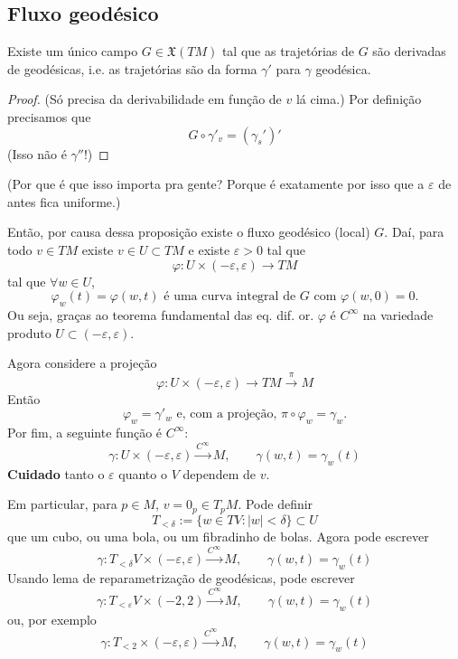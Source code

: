 \subsection{Fluxo geodésico}

\begin{prop}\leavevmode
Existe um único campo \(G \in \mathfrak{X}(TM)\) tal que as trajetórias de \(G\) são derivadas de geodésicas, i.e. as trajetórias são da forma \(\gamma'\) para \(\gamma\) geodésica.
\end{prop}

\begin{proof}\leavevmode
(Só precisa da derivabilidade em função de \(v\) lá cima.) Por definição precisamos que 
\[G \circ \gamma'_v=(\gamma_s')'\]
(Isso não é \(\gamma''\)!)
\end{proof}

(Por que é que isso importa pra gente? Porque é exatamente por isso que a \(\varepsilon\) de antes fica uniforme.)

Então, por causa dessa proposição existe o fluxo geodésico (local) \(G\). Daí, para todo \(v \in TM\) existe \(v \in U \subset TM\) e existe \(\varepsilon>0\) tal que
\[\varphi: U \times (-\varepsilon,\varepsilon) \longrightarrow TM\]
tal que \(\forall  w \in U\),
\[\varphi_w(t)=\varphi(w,t)\text{ é uma curva integral de \(G\) com \(\varphi(w,0)=0\).} \]
Ou seja, graças ao teorema fundamental das eq. dif. or. \(\varphi\) é \(C^\infty\) na variedade produto \(U \subset (-\varepsilon,\varepsilon)\).

Agora considere a projeção
\[\varphi: U \times (-\varepsilon,\varepsilon) \longrightarrow TM\xrightarrow{\pi} M\]
Então
\[\varphi_w=\gamma'_w \text{ e, com a projeção, } \pi\circ \varphi_w=\gamma_w.\]
Por fim, a seguinte função é \(C^\infty\):
\[\gamma:U \times (-\varepsilon,\varepsilon) \xrightarrow{C^\infty}M,\qquad  \gamma(w,t)=\gamma_w(t)\]
\textbf{Cuidado} tanto o \(\varepsilon\) quanto o \(V\) dependem de \(v\).

Em particular, para \(p \in M\), \(v =0_p \in T_pM\). Pode definir
\[T_{< \delta}:=\{w \in TV: |w|< \delta\} \subset U\]
que um cubo, ou uma bola, ou um fibradinho de bolas. Agora pode escrever
\[\gamma:T_{< \delta}V \times (-\varepsilon,\varepsilon) \xrightarrow{C^\infty}M,\qquad  \gamma(w,t)=\gamma_w(t)\]
Usando lema de reparametrização de geodésicas, pode escrever
\[\gamma:T_{< \varepsilon}V \times (-2,2) \xrightarrow{C^\infty}M,\qquad  \gamma(w,t)=\gamma_w(t)\]
ou, por exemplo
\[\gamma:T_{<2} \times (-\varepsilon,\varepsilon) \xrightarrow{C^\infty}M,\qquad  \gamma(w,t)=\gamma_w(t)\]

